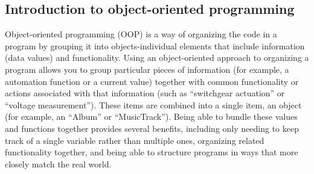 \subsection{Introduction to object-oriented programming}

Object-oriented programming (OOP) is a way of organizing the code 
in a program by grouping it into objects-individual elements that include 
information (data values) and functionality. Using an 
object-oriented approach to organizing a program allows 
you to group particular pieces of information (for 
example, a automation function or a current value) together with 
common functionality or actions associated with that 
information (such as ``switchgear actuation'' or 
``voltage measurement''). These items are combined into a single 
item, an object (for example, an ``Album'' or ``MusicTrack''). Being 
able to bundle these values and functions together provides several 
benefits, including only needing to keep track of a single 
variable rather than multiple ones, organizing related 
functionality together, and being able to structure 
programs in ways that more closely match the real world.  

